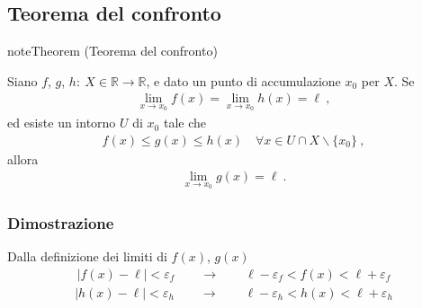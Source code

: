 \documentclass[letterpaper,10pt,italian]{jupyterBook}
\begin{document}
\subsection{Teorema del confronto}
\label{\detokenize{ch/infinitesimal_calculus/analysis:teorema-del-confronto}}\label{\detokenize{ch/infinitesimal_calculus/analysis:infinitesimal-calculus-limits-thms-comparison}}\label{None:thm:infinitesimal-calculus:continuous-fun:thms:comparison}
\begin{sphinxadmonition}{note}{Theorem  (Teorema del confronto)}



\sphinxAtStartPar
Siano \(f\), \(g\), \(h: \ X \in \mathbb{R} \rightarrow \mathbb{R}\), e dato un punto di accumulazione \(x_0\) per \(X\). Se
\begin{equation*}
\begin{split}\lim_{x \rightarrow x_0} f(x) = \lim_{x \rightarrow x_0} h(x) = \ell \ ,\end{split}
\end{equation*}
\sphinxAtStartPar
ed esiste un intorno \(U\) di \(x_0\) tale che
\begin{equation*}
\begin{split}f(x) \le g(x) \le h(x) \quad \forall x \in U \cap X \backslash \{ x_0 \} \ ,\end{split}
\end{equation*}
\sphinxAtStartPar
allora
\begin{equation*}
\begin{split}\lim_{x \rightarrow x_0} g(x) = \ell \ .\end{split}
\end{equation*}\end{sphinxadmonition}
\subsubsection*{Dimostrazione}

\sphinxAtStartPar
Dalla definizione dei limiti di \(f(x)\), \(g(x)\)
\begin{equation*}
\begin{split}|f(x) - \ell| < \varepsilon_f \qquad \rightarrow \qquad \ell - \varepsilon_f < f(x) < \ell + \varepsilon_f\end{split}
\end{equation*}\begin{equation*}
\begin{split}|h(x) - \ell| < \varepsilon_h \qquad \rightarrow \qquad \ell - \varepsilon_h < h(x) < \ell + \varepsilon_h\end{split}
\end{equation*}
\sphinxAtStartPar
{} 
\end{document}
